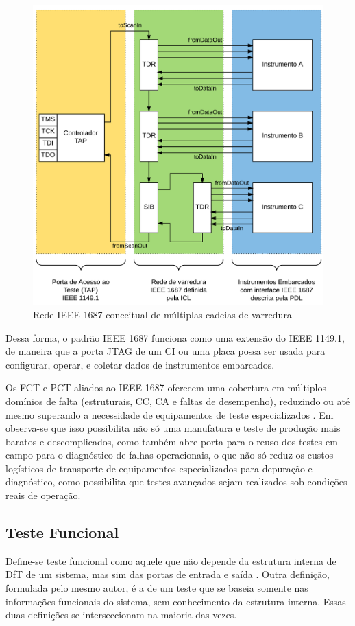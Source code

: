 \begin{figure}
    \centering
        \includegraphics[width=1.0\linewidth]{fig/IEEE1687}
            \caption{Rede IEEE 1687 conceitual de múltiplas cadeias de varredura}
            \label{fig:ieee1687}
\end{figure}

Dessa forma, o padrão IEEE 1687 funciona como uma extensão do IEEE 1149.1, de maneira que a porta JTAG de um CI ou uma placa possa ser usada para configurar, operar, e coletar dados de instrumentos embarcados.

Os FCT e PCT aliados ao IEEE 1687 oferecem uma cobertura em múltiplos domínios de falta (estruturais, CC, CA e faltas de desempenho), reduzindo ou até mesmo superando a necessidade de equipamentos de teste especializados \citep{thomaswenzel2013}. Em \citet{jutman2014high} observa-se que isso possibilita não só uma manufatura e teste de produção mais baratos e descomplicados, como também abre porta para o reuso dos testes em campo para o diagnóstico de falhas operacionais, o que não só reduz os custos logísticos de transporte de equipamentos especializados para depuração e diagnóstico, como possibilita que testes avançados sejam realizados sob condições reais de operação. 

\subsection{Teste Funcional}
Define-se teste funcional como aquele que não depende da estrutura interna de DfT de um sistema, mas sim das portas de entrada e saída \citep{jutman2014high}. Outra definição, formulada pelo mesmo autor, é a de um teste que se baseia somente nas informações funcionais do sistema, sem conhecimento da estrutura interna. Essas duas definições se interseccionam na maioria das vezes.

